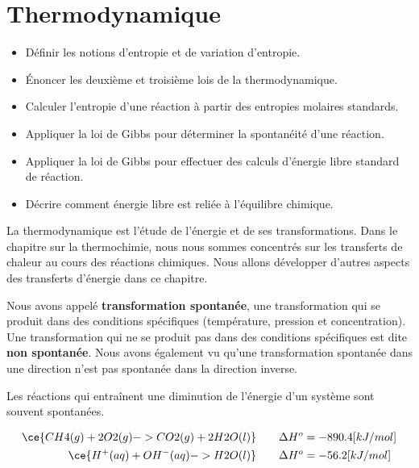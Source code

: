 \documentclass[
  11pt,
  french,
  a4paper,
  openany]{book}
\providecommand{\tightlist}{%
  \setlength{\itemsep}{0pt}\setlength{\parskip}{0pt}}
\begin{document}
\hypertarget{thermodynamique}{%
\chapter{Thermodynamique}\label{thermodynamique}}

\begin{objectives}

\begin{itemize}
\tightlist
\item
  Définir les notions d'entropie et de variation d'entropie.
\item
  Énoncer les deuxième et troisième lois de la thermodynamique.
\item
  Calculer l'entropie d'une réaction à partir des entropies molaires standards.
\item
  Appliquer la loi de Gibbs pour déterminer la spontanéité d'une réaction.
\item
  Appliquer la loi de Gibbs pour effectuer des calculs d'énergie libre standard de réaction.
\item
  Décrire comment énergie libre est reliée à l'équilibre chimique.
\end{itemize}


\end{objectives}

La thermodynamique est l'étude de l'énergie et de ses transformations. Dans le chapitre sur la thermochimie, nous nous sommes concentrés sur les transferts de chaleur au cours des réactions chimiques. Nous allons développer d'autres aspects des transferts d'énergie dans ce chapitre.

Nous avons appelé \textbf{transformation spontanée}, une transformation qui se produit dans des conditions spécifiques (température, pression et concentration). Une transformation qui ne se produit pas dans des conditions spécifiques est dite \textbf{non spontanée}. Nous avons également vu qu'une transformation spontanée dans une direction n'est pas spontanée dans la direction inverse.

Les réactions qui entraînent une diminution de l'énergie d'un système sont souvent spontanées.

\[
\begin{split}
    \ce{CH4(g) + 2O2(g) -> CO2(g) + 2H2O(l)} &\qquad \Delta H^{o} = -890.4 [kJ/mol] \\
    \ce{H^+(aq) + OH^-(aq) -> H2O(l)} &\qquad \Delta H^{o} = -56.2 [kJ/mol]
\end{split}
\]
\end{document}
